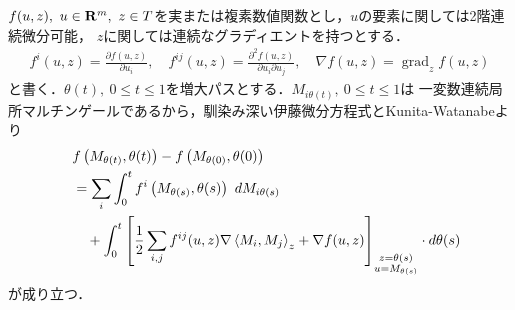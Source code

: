 	$f(u,z),\ u \in \mathbf{R}^{m},\ z \in T$を実または複素数値関数とし，$u$の要素に関しては2階連続微分可能，
	$z$に関しては連続なグラディエントを持つとする．
	\begin{align}
		f^{i}(u,z) = \frac{\partial f(u,z)}{\partial u_{i}},
		\quad f^{ij}(u,z) = \frac{\partial^{2} f(u,z)}{\partial u_{i} \partial u_{j}},
		\quad \nabla f(u,z) = \operatorname{grad}_{z} f(u,z)
	\end{align}
	と書く．$\theta(t),\ 0 \leq t \leq 1$を増大パスとする．$M_{i\theta(t)},\ 0 \leq t \leq 1$は
	一変数連続局所マルチンゲールであるから，馴染み深い伊藤微分方程式とKunita-Watanabeより
	\begin{align}
		&f\left(M_{\theta(t)},\theta(t)\right) - f\left(M_{\theta(0)},\theta(0)\right) \\
		\quad &= \sum_{i} \int_{0}^{t} f^{i}\left(M_{\theta(s)},\theta(s)\right)\ dM_{i\theta(s)} \\
		&\quad + \int_{0}^{t} \left[\frac{1}{2}\sum_{i,j}f^{ij}(u,z) 
		\nabla\inprod<M_{i},M_{j}>_{z} + \nabla f(u,z)\right]_{\substack{z=\theta(s) \\ u=M_{\theta(s)}}} \cdot d\theta(s)
	\end{align}
	が成り立つ．